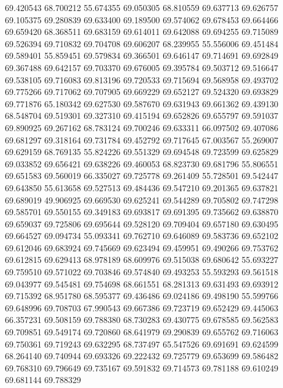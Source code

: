 69.420543
68.700212
55.674355
69.050305
68.810559
69.637713
69.626757
69.105375
69.280839
69.633400
69.189500
69.574062
69.678453
69.664466
69.659420
68.368511
69.683159
69.614011
69.642088
69.694255
69.715089
69.526394
69.710832
69.704708
69.606207
68.239955
55.556006
69.451484
69.589401
55.859451
69.579834
69.366501
69.646147
69.714691
69.692849
69.367488
69.642157
69.703370
69.676005
69.395784
69.503712
69.516647
69.538105
69.716083
69.813196
69.720533
69.715694
69.568958
69.493702
69.775266
69.717062
69.707905
69.669229
69.652127
69.524320
69.693829
69.771876
65.180342
69.627530
69.587670
69.631943
69.661362
69.439130
68.548704
69.519301
69.327310
69.415194
69.652826
69.655797
69.591037
69.890925
69.267162
68.783124
69.700246
69.633311
66.097502
69.407086
69.681297
69.318164
69.731784
69.452792
69.717645
67.003567
55.269007
69.629159
68.769135
55.824226
69.551329
69.694548
69.723599
69.625829
69.033852
69.656421
69.638226
69.460053
68.823730
69.681796
55.806551
69.651583
69.560019
66.335027
69.725778
69.261409
55.728501
69.542447
69.643850
55.613658
69.527513
69.484436
69.547210
69.201365
69.637821
69.689019
49.906925
69.669530
69.625241
69.544289
69.705802
69.747298
69.585701
69.550155
69.349183
69.693817
69.691395
69.735662
69.638870
69.659037
69.725806
69.695644
69.528120
69.709404
69.657180
69.630495
69.664527
69.094734
55.093341
69.762710
69.646089
69.583736
69.652102
69.612046
69.683924
69.745669
69.623494
69.459951
69.490266
69.753762
69.612815
69.629413
68.978189
68.609976
69.515038
69.680642
55.693227
69.759510
69.571022
69.703846
69.574840
69.493253
55.593293
69.561518
69.043977
69.545481
69.754698
68.661551
68.281313
69.631493
69.693912
69.715392
68.951780
68.595377
69.436486
69.024186
69.498190
55.599766
69.648996
69.708703
67.990543
69.667386
69.723719
69.652429
69.445063
66.357231
69.508159
69.788380
68.730283
69.430775
69.678585
69.562583
69.709851
69.549174
69.720860
68.641979
69.290839
69.655762
69.716063
69.750361
69.719243
69.632295
68.737497
65.547526
69.691691
69.624599
68.264140
69.740944
69.693326
69.222432
69.725779
69.653699
69.586482
69.768310
69.796649
69.735167
69.591832
69.714573
69.781188
69.610249
69.681144
69.788329
